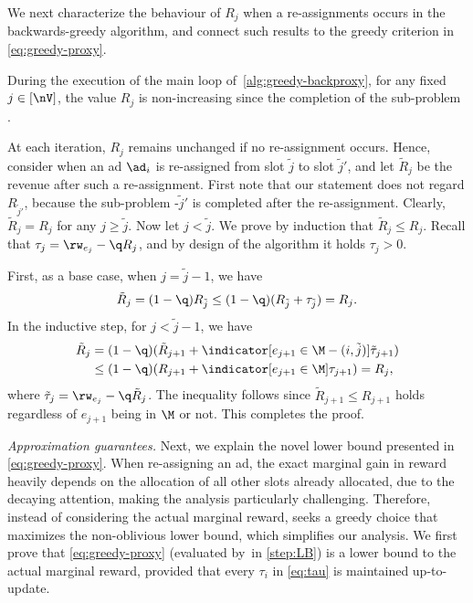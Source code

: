 We next characterize the behaviour of $R_j$ when a re-assignments occurs in the backwards-greedy algorithm,
and connect such results to the greedy criterion in \cref{eq:greedy-proxy}.

\begin{lemmaE}\label{lemma:R}
	During the execution of the main loop of~\cref{alg:greedy-backproxy},
	for any fixed $j \in [\nV]$,
	the value $R_j$ is non-increasing 
	since the completion of the sub-problem \streamadsj.
	\end{lemmaE}
\begin{proofE}
	At each iteration, $R_j$ remains unchanged if no re-assignment occurs.
	Hence, consider when an ad $\ad_i$ 
	is re-assigned from slot $\tilde{j}$ to slot $\tilde{j}'$, and
	let $\tilde{R}_j$ be the revenue after such a re-assignment.
	First note that our statement does not regard $R_{\tilde{j}'}$, 
	because the sub-problem \streamads-$\tilde{j}'$ is completed after the re-assignment.
	Clearly, $\tilde{R}_{j} = R_{j}$ for any $j \ge \tilde{j}$.
	Now let $j < \tilde{j}$. 
	We prove by induction that $\tilde{R}_{j} \le R_{j}$.
	Recall that $\tau_{j} = \rw_{e_{j}} - \q R_{j}$,
	and by design of the \alggbackproxy algorithm it holds $\tau_{j} > 0$. 
	
	First, as a base case, when $j = \tilde{j} - 1$, we have
	\[
	\tilde{R}_{j}  = (1-\q) R_{\tilde{j}} 
	\le (1-\q) (R_{\tilde{j}} + \tau_{\tilde{j}})
	= R_{j}.
	\]
	In the inductive step, for $j< \tilde{j} -1 $, we have
	\begin{align*}
		\tilde{R}_{j}  &= (1-\q) (\tilde{R}_{j+1} + \indicator[e_{j+1} \in \M - (i,\tilde{j})] \tilde{\tau}_{j+1}) \\
		&\le (1-\q) (R_{j+1} + \indicator[e_{j+1} \in \M] \tau_{j+1})
		= R_{j},
	\end{align*}
	where $\tilde{\tau}_{j} = \rw_{e_{j}} - \q \tilde{R}_{j}$.
	The inequality follows since $\tilde{R}_{j+1} \le R_{j+1}$ holds regardless of $e_{j+1}$ being in $\M$ or not.
	This completes the proof.
\end{proofE}


\smallskip
\noindent
\emph{Approximation guarantees.}
Next, we explain the novel lower bound presented in \cref{eq:greedy-proxy}.
When re-assigning an ad, the exact marginal gain in reward 
heavily depends on the allocation of all other slots already allocated,
due to the decaying attention,
making the analysis particularly challenging.
Therefore, instead of considering the actual marginal reward, %
\alggbackproxy seeks a greedy choice that
maximizes the non-oblivious lower bound, 
which simplifies our analysis.
We first prove that \cref{eq:greedy-proxy} (evaluated by~\alggbackproxy in \cref{step:LB}) 
is a lower bound to the actual marginal reward,
provided that every $\tau_i$ in \cref{eq:tau} is maintained up-to-update.

